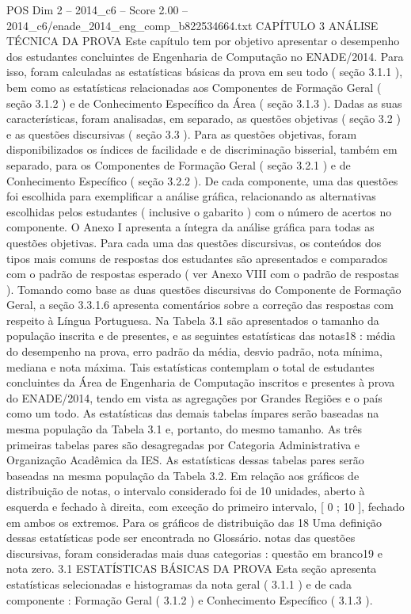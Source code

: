 \begin{textsample}{POS Dim 2 – 2014\_c6 – Score 2.00 – 2014\_c6/enade\_2014\_eng\_comp\_b822534664.txt}  \label{ex:f2_pos_227}
CAPÍTULO 3 ANÁLISE TÉCNICA DA PROVA Este capítulo tem por objetivo apresentar o desempenho dos estudantes concluintes de Engenharia de Computação no ENADE/2014.
Para isso, foram calculadas as estatísticas básicas da prova em seu todo ( seção 3.1.1 ), bem como as estatísticas relacionadas aos Componentes de Formação Geral ( seção 3.1.2 ) e de Conhecimento Específico da Área ( seção 3.1.3 ).
Dadas as suas características, foram analisadas, em separado, as questões objetivas ( seção 3.2 ) e as questões discursivas ( seção 3.3 ).
Para as questões objetivas, foram disponibilizados os índices de facilidade e de discriminação bisserial, também em separado, para os Componentes de Formação Geral ( seção 3.2.1 ) e de Conhecimento Específico ( seção 3.2.2 ).
De cada componente, uma das questões foi escolhida para exemplificar a análise gráfica, relacionando as alternativas escolhidas pelos estudantes ( inclusive o gabarito ) com o número de acertos no componente.
O Anexo I apresenta a íntegra da análise gráfica para todas as questões objetivas.
Para cada uma das questões discursivas, os conteúdos dos tipos mais comuns de respostas dos estudantes são apresentados e comparados com o padrão de respostas esperado ( ver Anexo VIII com o padrão de respostas ).
Tomando como base as duas questões discursivas do Componente de Formação Geral, a seção 3.3.1.6 apresenta comentários sobre a correção das respostas com respeito à Língua Portuguesa.
Na Tabela 3.1 são apresentados o tamanho da população inscrita e de presentes, e as seguintes estatísticas das notas18 : média do desempenho na prova, erro padrão da média, desvio padrão, nota mínima, mediana e nota máxima.
Tais estatísticas contemplam o total de estudantes concluintes da Área de Engenharia de Computação inscritos e presentes à prova do ENADE/2014, tendo em vista as agregações por Grandes Regiões e o país como um todo.
As estatísticas das demais tabelas ímpares serão baseadas na mesma população da Tabela 3.1 e, portanto, do mesmo tamanho.
As três primeiras tabelas pares são desagregadas por Categoria Administrativa e Organização Acadêmica da IES.
As estatísticas dessas tabelas pares serão baseadas na mesma população da Tabela 3.2.
Em relação aos gráficos de distribuição de notas, o intervalo considerado foi de 10 unidades, aberto à esquerda e fechado à direita, com exceção do primeiro intervalo, [ 0 ; 10 ], fechado em ambos os extremos.
Para os gráficos de distribuição das 18 Uma definição dessas estatísticas pode ser encontrada no Glossário. notas das questões discursivas, foram consideradas mais duas categorias : questão em branco19 e nota zero. 3.1 ESTATÍSTICAS BÁSICAS DA PROVA Esta seção apresenta estatísticas selecionadas e histogramas da nota geral ( 3.1.1 ) e de cada componente : Formação Geral ( 3.1.2 ) e Conhecimento Específico ( 3.1.3 ).

\end{textsample}

